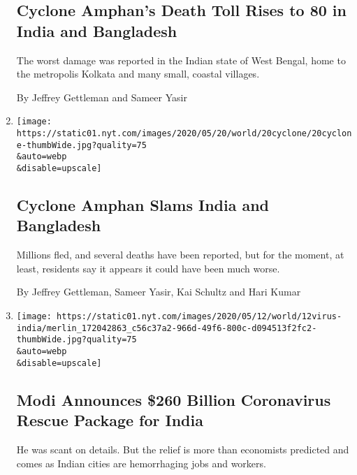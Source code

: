 \begin{enumerate}
  \hypertarget{cyclone-amphans-death-toll-rises-to-80-in-india-and-bangladesh}{%
  \subsection{Cyclone Amphan's Death Toll Rises to 80 in India and
  Bangladesh}\label{cyclone-amphans-death-toll-rises-to-80-in-india-and-bangladesh}}

  The worst damage was reported in the Indian state of West Bengal, home
  to the metropolis Kolkata and many small, coastal villages.

  By Jeffrey Gettleman and Sameer Yasir
\item
  \href{/2020/05/20/world/asia/cyclone-amphan-india-bangladesh.html}{}

  \texttt{[image: https://static01.nyt.com/images/2020/05/20/world/20cyclone/20cyclone-thumbWide.jpg?quality=75\\\&auto=webp\\\&disable=upscale]}

  \hypertarget{cyclone-amphan-slams-india-and-bangladesh}{%
  \subsection{Cyclone Amphan Slams India and
  Bangladesh}\label{cyclone-amphan-slams-india-and-bangladesh}}

  Millions fled, and several deaths have been reported, but for the
  moment, at least, residents say it appears it could have been much
  worse.

  By Jeffrey Gettleman, Sameer Yasir, Kai Schultz and Hari Kumar
\item
  \href{/2020/05/12/world/asia/virus-india-rescue-package.html}{}

  \texttt{[image: https://static01.nyt.com/images/2020/05/12/world/12virus-india/merlin\_172042863\_c56c37a2-966d-49f6-800c-d094513f2fc2-thumbWide.jpg?quality=75\\\&auto=webp\\\&disable=upscale]}

  \hypertarget{modi-announces-260-billion-coronavirus-rescue-package-for-india}{%
  \subsection{Modi Announces \$260 Billion Coronavirus Rescue Package
  for
  India}\label{modi-announces-260-billion-coronavirus-rescue-package-for-india}}

  He was scant on details. But the relief is more than economists
  predicted and comes as Indian cities are hemorrhaging jobs and
  workers.


\end{enumerate}
